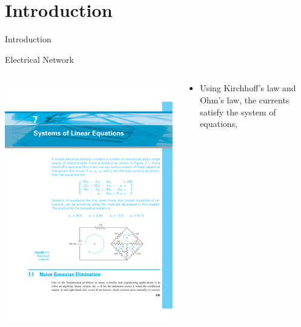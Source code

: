 \documentclass{beamer}
\begin{document}
\section[Introduction]{Introduction}
\begin{frame}{Introduction}
\begin{block}{Electrical Network}
\begin{columns}
\begin{column}{0.35\textwidth}
\centerline{\includegraphics[width=\textwidth]{Lec10_fig1}}
\end{column}
\begin{column}{0.65\textwidth}
\begin{itemize}
\footnotesize
\item Using Kirchhoff's law and Ohm's law, the currents satisfy the system of equations,
\begin{align*}

\end{align*}
\end{itemize}
\end{column}
\end{columns}
\end{block}
\end{frame}
\end{document}
